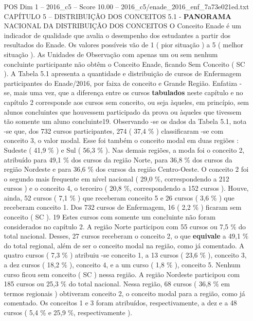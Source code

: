 \begin{textsample}{POS Dim 1 – 2016\_c5 – Score 10.00 – 2016\_c5/enade\_2016\_enf\_7a73e021ed.txt}  \label{ex:f1_pos_077}
CAPÍTULO 5 – DISTRIBUIÇÃO DOS CONCEITOS 5.1 - \textbf{PANORAMA} NACIONAL DA DISTRIBUIÇÃO DOS CONCEITOS O Conceito Enade é um indicador de qualidade que avalia o desempenho dos estudantes a partir dos resultados do Enade.
Os valores possíveis vão de 1 ( pior situação ) a 5 ( melhor situação ).
As Unidades de Observação com apenas um ou sem nenhum concluinte participante não obtêm o Conceito Enade, ficando Sem Conceito ( SC ).
A Tabela 5.1 apresenta a quantidade e distribuição de cursos de Enfermagem participantes do Enade/2016, por faixa de conceito e Grande Região.
Enfatiza -se, mais uma vez, que a diferença entre os cursos \textbf{tabulados} neste capítulo e no capítulo 2 corresponde aos cursos sem conceito, ou seja àqueles, em princípio, sem alunos concluintes que houvessem participado da prova ou àqueles que tivessem tão somente um aluno concluinte19.
Observando -se os dados da Tabela 5.1, nota -se que, dos 732 cursos participantes, 274 ( 37,4 \% ) classificaram -se com conceito 3, o valor modal.
Esse foi também o conceito modal em duas regiões : Sudeste ( 41,9 \% ) e Sul ( 56,3 \% ).
Nas demais regiões, a moda foi o conceito 2, atribuído para 49,1 \% dos cursos da região Norte, para 36,8 \% dos cursos da região Nordeste e para 36,6 \% dos cursos da região Centro-Oeste.
O conceito 2 foi o segundo mais frequente em nível nacional ( 29,0 \%, correspondendo a 212 cursos ) e o conceito 4, o terceiro ( 20,8 \%, correspondendo a 152 cursos ).
Houve, ainda, 52 cursos ( 7,1 \% ) que receberam conceito 5 e 26 cursos ( 3,6 \% ) que receberam conceito 1.
Dos 732 cursos de Enfermagem, 16 ( 2,2 \% ) ficaram sem conceito ( SC ). 19 Estes cursos com somente um concluinte não foram considerados no capítulo 2.
A região Norte participou com 55 cursos ou 7,5 \% do total nacional.
Desses, 27 cursos receberam o conceito 2, o que \textbf{equivale} a 49,1 \% do total regional, além de ser o conceito modal na região, como já comentado.
A quatro cursos ( 7,3 \% ) atribuiu -se conceito 1, a 13 cursos ( 23,6 \% ), conceito 3, a dez cursos ( 18,2 \% ), conceito 4, e a um curso ( 1,8 \% ), conceito 5.
Nenhum curso ficou sem conceito ( SC ) nessa região.
A região Nordeste participou com 185 cursos ou 25,3 \% do total nacional.
Nessa região, 68 cursos ( 36,8 \% em termos regionais ) obtiveram conceito 2, o conceito modal para a região, como já comentado.
Os conceitos 1 e 3 foram atribuídos, respectivamente, a dez e a 48 cursos ( 5,4 \% e 25,9 \%, respectivamente ).

\end{textsample}
